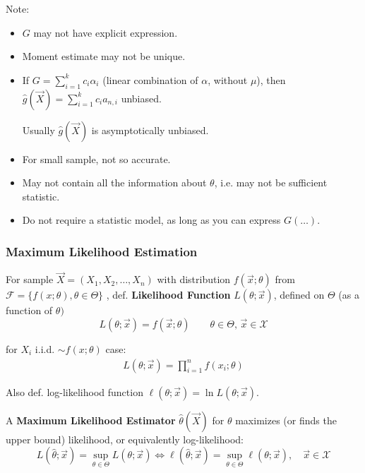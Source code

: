     \begin{point}
        Note:
    \end{point}
    
        
    \begin{itemize}
        \item $G$ may not have explicit expression.
        \item Moment estimate may not be unique.
        \item If $G={\displaystyle\sum_{i=1}^kc_i\alpha_i}$ (linear combination of $\alpha$, without $\mu$), then $\hat{g}(\vec{X})={\displaystyle\sum_{i=1}^kc_ia_{n,i}}$ unbiased.
        
        \qquad Usually $\hat{g}(\vec{X})$ is asymptotically unbiased.
        \item For small sample, not so accurate.
        \item May not contain all the information about $\theta$, i.e. may not be sufficient statistic.
        \item Do not require a statistic model, as long as you can express $ G(\ldots) $.
    \end{itemize}


\subsubsection{Maximum Likelihood Estimation}\label{SubSectionMLE}
    For sample $\vec{X}=(X_1,X_2,\ldots,X_n)$ with distribution $f(\vec{x};\theta)$ from $\mathscr{F}=\{f(x;\theta),\theta\in\Theta\}$ , def. \textbf{Likelihood Function} $L(\theta;\vec{x})$, defined on $\Theta$ (as a function of $\theta)$
    \begin{equation}
        L(\theta;\vec{x})=f(\vec{x};\theta)\qquad \theta\in\Theta,\,\vec{x}\in\mathscr{X}    
    \end{equation}

    for $ X_i $ i.i.d. $ \sim f(x;\theta ) $ case:
    \begin{align}
        L(\theta ;\vec{x})=\prod_{i=1}^nf (x_i;\theta )
    \end{align}
    
    

    Also def. log-likelihood function $\ell(\theta;\vec{x})=\ln L(\theta;\vec{x})$.

    A \textbf{Maximum Likelihood Estimator} $\hat{\theta}(\vec{X})$ for $ \theta  $ maximizes (or finds the upper bound) likelihood, or equivalently log-likelihood:
    \begin{equation}
        L(\hat{\theta};\vec{x})=\sup_{\theta\in\Theta}L(\theta;\vec{x})\Leftrightarrow \ell(\hat{\theta};\vec{x})=\sup_{\theta\in\Theta}\ell(\theta;\vec{x}) ,\quad \vec{x}\in\mathscr{X}
    \end{equation}

